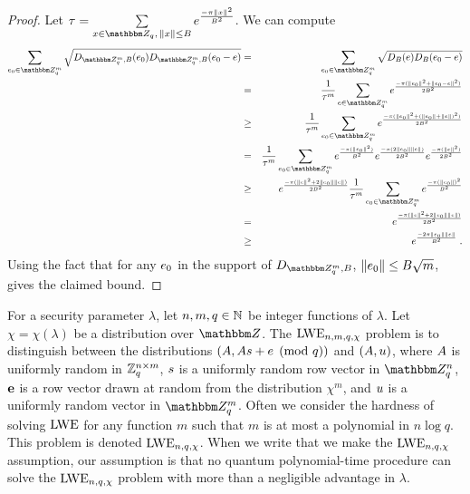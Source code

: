 \begin{proof}
Let $\tau = \sum\limits_{x\in\mZ_q,\, \|x\|\leq B}e^{\frac{-\pi\lVert x\rVert^2}{B^2}}$. We can compute
\begin{eqnarray*}
\sum_{\*e_0\in \mZ_q^m} \sqrt{D_{\mZ_q^{m},B}(\*e_0)D_{\mZ_q^{m},B}(\*e_0-\*e)} &=& \sum_{\*e_0\in \mZ_q^m}  \sqrt{D_{B}(\*e)D_{B}(\*e_0-\*e)}\\
&=& \frac{1}{\tau^m}\sum_{\*e\in \mZ_q^m}e^{\frac{-\pi(\|\*e_0\|^2 + \|\*e_0 - \*e\|^2)}{2B^2}}\\
&\geq& \frac{1}{\tau^m}\sum_{\*e_0\in \mZ_q^m}e^{\frac{-\pi(\|\*e_0\|^2 + (\|\*e_0\| + \|\*e\|)^2)}{2B^2}}\\
&=& \frac{1}{\tau^m}\sum_{\*e_0\in \mZ_q^m}e^{\frac{-\pi(\|\*e_0\|^2)}{B^2}}e^{\frac{-\pi(2\|\*e_0\|\|\*e\|)}{2B^2}}e^{\frac{-\pi(\|\*e\|^2)}{2B^2}}\\
&\geq& e^{\frac{-\pi(\|\*e\|^2 + 2\|\*e_0\|\|\*e\|)}{2B^2}}\frac{1}{\tau^m}\sum_{\*e_0\in \mZ_q^m}e^{\frac{-\pi(\|\*e_0\|)^2}{B^2}}\\
&=& e^{\frac{-\pi(\|\*e\|^2 + 2\|\*e_0\|\|\*e\|)}{2B^2}}\label{eq:distequality}\\
&\geq& e^{\frac{-2\pi \|\*e_0\|\|\*e\|}{B^2}}\;.
\end{eqnarray*}
Using the fact that for any $\*e_0$ in the support of $D_{\mZ_q^m,B}$, $\|\*e_0\|\leq B\sqrt{m}$,  gives the claimed bound.
\end{proof}



\begin{definition}
For a security parameter $\lambda$, let $n,m,q\in \mathbb{N}$ be integer functions of $\lambda$. Let $\chi = \chi(\lambda)$ be a distribution over $\mZ$. The $\mathrm{LWE}_{n,m,q,\chi}$ problem is to distinguish between the distributions $(\*A, \*A\*s + \*e \pmod{q})$ and $(\*A, \*u)$, where $\*A$ is uniformly random in $\mathbb{Z}_q^{n \times m}$, $\*s$ is a uniformly random row vector in $\mZ_q^n$, $\mathbf{{e}}$ is a  row vector drawn at random from the distribution $\chi^m$, and $\*u$ is a uniformly random vector in $\mZ_q^m$. Often we consider the hardness of solving $\mathrm{LWE}$ for {any} function $m$ such that $m$ is at most a polynomial in $n \log q$. This problem is denoted $\mathrm{LWE}_{n,q,\chi}$. When we write that we make the $\mathrm{LWE}_{n,q,\chi}$ assumption, our assumption is that no quantum polynomial-time procedure can solve the $\mathrm{LWE}_{n,q,\chi}$ problem with more than a negligible advantage in $\lambda$. 
\end{definition}



